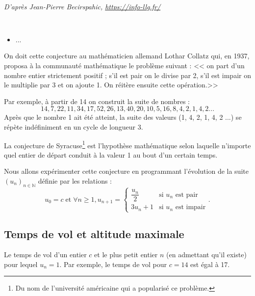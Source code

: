 \setcounter{numques}{0}~\\

\begin{flushright}
\textit{D'après Jean-Pierre Becirspahic, \url{https://info-llg.fr/}}
\end{flushright}
\begin{obj} ~\\
\begin{itemize}
\item ...
\end{itemize}
\end{obj}


On doit cette conjecture au mathématicien allemand Lothar Collatz qui, en 1937, proposa à la communauté mathématique
le problème suivant : << on part d’un nombre entier strictement positif ; s’il est pair on le divise par 2, s’il est impair on le multiplie par 3 et on ajoute 1. On réitère ensuite cette opération.>>

Par exemple, à partir de 14 on construit la suite de nombres :
$$14 ,7 ,22 ,11 ,34, 17, 52, 26, 13, 40, 20, 10, 5, 16, 8, 4, 2, 1, 4, 2 ...$$
Après que le nombre 1 ait été atteint, la suite des valeurs (1, 4, 2, 1, 4, 2 ...) se répète indéfiniment en un cycle de
longueur 3.

La conjecture de Syracuse\footnote{Du nom de l’université américaine qui a popularisé ce problème.} est l’hypothèse mathématique selon laquelle n’importe quel entier de départ conduit à la valeur 1 au bout d’un certain temps.

Nous allons expérimenter cette conjecture en programmant l’évolution de la suite $\left(u_n\right)_{n\in \mathbb{N}}$ définie par les relations :
$$
u_0=c \;\text{et} \; \forall n\geq 1, u_{n+1}=\left\{
\begin{array}{ll} 
\dfrac{u_n}{2} & \text{si }u_n \text{ est pair}\\
3 u_n + 1  & \text{si }u_n \text{ est impair}
\end{array} \right. .
$$

\subsection*{Temps de vol et altitude maximale}
Le temps de vol d’un entier $c$ et le plus petit entier $n$ (en admettant qu’il existe) pour lequel $u_n = 1$. Par exemple, le temps de vol pour $c = 14$ est égal à 17.


